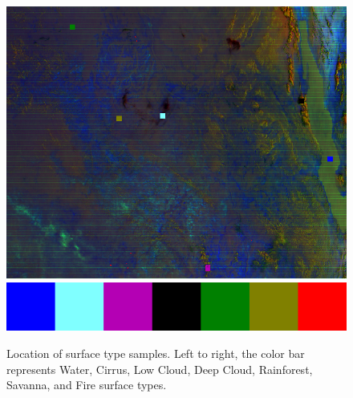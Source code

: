 \documentclass[12pt]{article}
\begin{document}
\begin{figure}[h!]
    \centering

    \includegraphics[width=.8\linewidth]{figures/rgb_samples_fc.png}
    \includegraphics[width=.3\linewidth]{figures/rgb_sample_cbar.png}

    \caption{Location of surface type samples. Left to right, the color bar represents Water, Cirrus, Low Cloud, Deep Cloud, Rainforest, Savanna, and Fire surface types.}
    \label{p6_temp_samples}
\end{figure}
\end{document}
